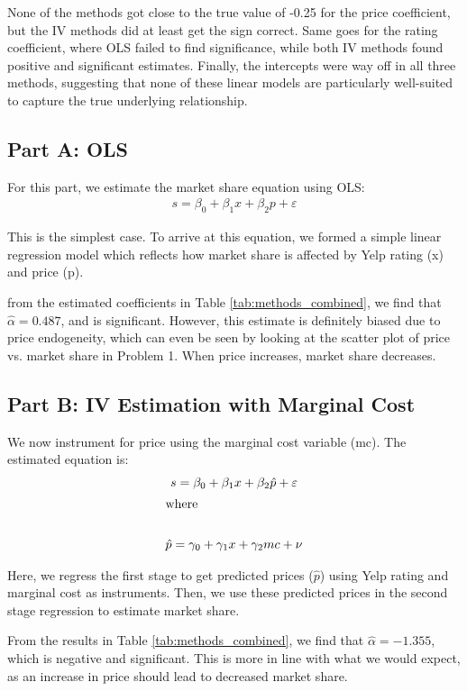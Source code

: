 \documentclass{article}
\begin{document}
None of the methods got close to the true value of -0.25 for the price coefficient, but the IV methods did at least get the sign correct.
Same goes for the rating coefficient, where OLS failed to find significance, while both IV methods found positive and significant estimates.
Finally, the intercepts were way off in all three methods, suggesting that none of these linear models are particularly well-suited
to capture the true underlying relationship.

\subsection*{Part A: OLS}

For this part, we estimate the market share equation using OLS:
\begin{gather*}
  s = \beta_0 + \beta_1 x + \beta_2 p + \varepsilon
\end{gather*}

This is the simplest case. To arrive at this equation, we formed a simple linear regression model
which reflects how market share is affected by Yelp rating (x) and price (p).

from the estimated coefficients in Table \ref{tab:methods_combined},
we find that $\hat{\alpha} = 0.487$, and is significant. However, this 
estimate is definitely biased due to price endogeneity, which can even
be seen by looking at the scatter plot of price vs. market share in Problem 1.
When price increases, market share decreases.


\subsection*{Part B: IV Estimation with Marginal Cost}

We now instrument for price using the marginal cost variable (mc).
The estimated equation is:
\begin{gather*}
  s = \beta_0 + \beta_1 x + \beta_2 \hat{p} + \varepsilon \\
  \shortintertext{where} \\
  \hat{p} = \gamma_0 + \gamma_1 x + \gamma_2 mc + \nu
\end{gather*}

Here, we regress the first stage to get predicted prices ($\hat{p}$) using Yelp rating and marginal cost as instruments.
Then, we use these predicted prices in the second stage regression to estimate market share.

From the results in Table \ref{tab:methods_combined}, we find that $\hat{\alpha} = -1.355$, which is negative and significant.
This is more in line with what we would expect, as an increase in price should lead to decreased market share.
\end{document}
